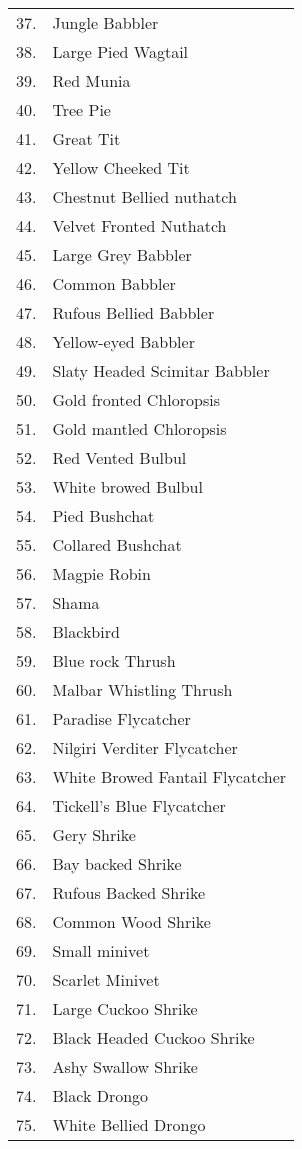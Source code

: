{\begin{longtable}{cl}
37.	& Jungle Babbler \\
38.	& Large Pied Wagtail \\
39.	& Red Munia \\
40.	& Tree Pie \\
41.	& Great Tit \\
42.	& Yellow Cheeked Tit \\
43.	& Chestnut Bellied nuthatch \\
44.	& Velvet Fronted Nuthatch \\
45.	& Large Grey Babbler \\
46.	& Common Babbler \\
47.	& Rufous Bellied Babbler \\
48. & Yellow-eyed Babbler \\
49. & Slaty Headed Scimitar Babbler \\
50. & Gold fronted Chloropsis \\
51. & Gold mantled Chloropsis \\
52. & Red Vented Bulbul \\
53.	& White browed Bulbul \\
54.	& Pied Bushchat \\
55.	& Collared Bushchat \\
56.	& Magpie Robin \\
57.	& Shama \\
58.	& Blackbird \\
59.	& Blue rock Thrush \\
60.	& Malbar Whistling Thrush \\
61.	& Paradise Flycatcher \\
62.	& Nilgiri Verditer Flycatcher \\
63.	& White Browed Fantail Flycatcher \\
64.	& Tickell's Blue Flycatcher \\
65.	& Gery Shrike \\
66.	& Bay backed Shrike \\
67.	& Rufous Backed Shrike\\ 
68.	& Common Wood Shrike \\
69.	& Small minivet \\
70.	& Scarlet Minivet \\
71.	& Large Cuckoo Shrike \\
72.	& Black Headed Cuckoo Shrike \\
73.	& Ashy Swallow Shrike \\
74.	& Black Drongo \\
75.	& White Bellied Drongo \\

\end{longtable}}
